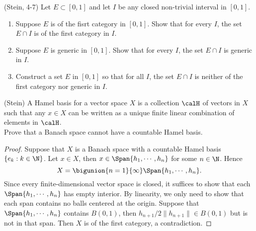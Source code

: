 \begin{problemset}
\item (Stein, 4-7) Let $E \subset [0,1]$ and let $I$ be any closed non-trivial interval in $[0,1]$. 
\begin{enumerate}
    \item Suppose $E$ is of the fisrt category in $[0,1]$. Show that for every $I$, the set $E \cap I$ is of the first category in $I$. 
    \item Suppose $E$ is generic in $[0,1]$. Show that for every $I$, the set $E \cap I$ is generic in $I$. 
    \item Construct a set $E$ in $[0,1]$ so that for all $I$, the set $E \cap I$ is neither of the first category nor generic in $I$. 
\end{enumerate}

\item (Stein) A Hamel basis for a vector space $X$ is a collection $\calH$ of vectors in $X$ such that any $x \in X$ can be written as a unique finite linear combination of elements in $\calH$. \\
Prove that a Banach space cannot have a countable Hamel basis.
\begin{proof}
    Suppose that $X$ is a Banach space with a countable Hamel basis 
    $\{e_k: k\in \N\}$. Let $x \in X$, then $x \in \Span \{h_1, \cdots, h_n\}$ for some $n \in \N$. Hence 
    $$X = \bigunion{n=1}{\infty}\Span \{h_1, \cdots, h_n\}.$$
    Since every finite-dimensional vector space is closed, it suffices to show that each $\Span \{h_1, \cdots, h_n\}$ has empty interior. By linearity, we only need to show that each span contains no balls centered at the origin. 
    Suppose that $\Span \{h_1, \cdots, h_n\}$ contains $B(0,1)$, then $h_{n+1}/2\|h_{n+1}\| \in B(0,1)$ but is not in that span. 
    Then $X$ is of the first category, a contradiction. 
\end{proof}


\end{problemset}
